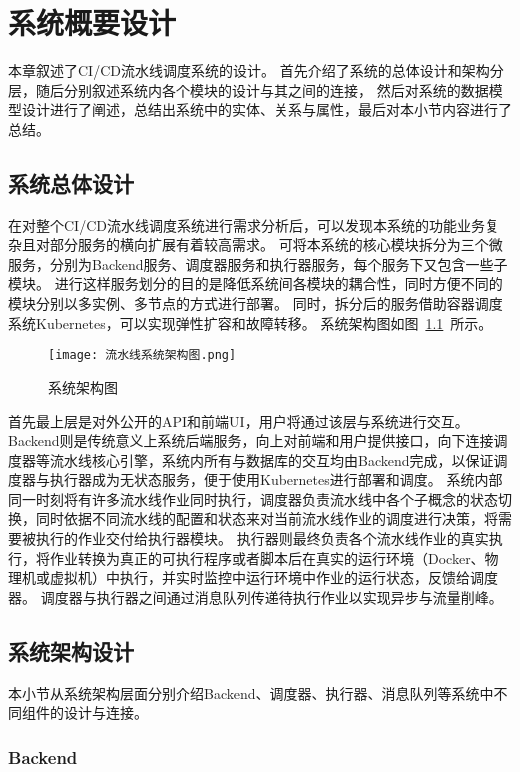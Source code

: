 
\chapter{系统概要设计}
本章叙述了CI/CD流水线调度系统的设计。
首先介绍了系统的总体设计和架构分层，随后分别叙述系统内各个模块的设计与其之间的连接，
然后对系统的数据模型设计进行了阐述，总结出系统中的实体、关系与属性，最后对本小节内容进行了总结。

\section{系统总体设计}

在对整个CI/CD流水线调度系统进行需求分析后，可以发现本系统的功能业务复杂且对部分服务的横向扩展有着较高需求。
可将本系统的核心模块拆分为三个微服务，分别为Backend服务、调度器服务和执行器服务，每个服务下又包含一些子模块。
进行这样服务划分的目的是降低系统间各模块的耦合性，同时方便不同的模块分别以多实例、多节点的方式进行部署。
同时，拆分后的服务借助容器调度系统Kubernetes，可以实现弹性扩容和故障转移。
系统架构图如图~\ref{fig:系统架构图}~所示。

\begin{figure}[h]
  \centering
  \texttt{[image: 流水线系统架构图.png]}
  \caption{系统架构图}
  \label{fig:系统架构图}
\end{figure}

首先最上层是对外公开的API和前端UI，用户将通过该层与系统进行交互。
Backend则是传统意义上系统后端服务，向上对前端和用户提供接口，向下连接调度器等流水线核心引擎，系统内所有与数据库的交互均由Backend完成，以保证调度器与执行器成为无状态服务，便于使用Kubernetes进行部署和调度。
系统内部同一时刻将有许多流水线作业同时执行，调度器负责流水线中各个子概念的状态切换，同时依据不同流水线的配置和状态来对当前流水线作业的调度进行决策，将需要被执行的作业交付给执行器模块。
执行器则最终负责各个流水线作业的真实执行，将作业转换为真正的可执行程序或者脚本后在真实的运行环境（Docker、物理机或虚拟机）中执行，并实时监控中运行环境中作业的运行状态，反馈给调度器。
调度器与执行器之间通过消息队列传递待执行作业以实现异步与流量削峰。


\section{系统架构设计}
本小节从系统架构层面分别介绍Backend、调度器、执行器、消息队列等系统中不同组件的设计与连接。

\subsection{Backend}


